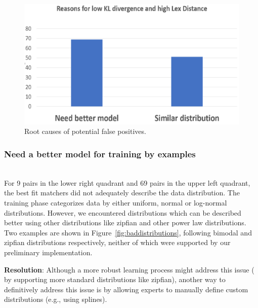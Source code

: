 \begin{figure}
	\centering
	\includegraphics[width=\columnwidth]{graphics/Upper_left_quad}
	\caption{Root causes of potential false positives.}
	\label{fig:datatags:upperleft}
	\trimfigurespacing
\end{figure}

\smallskip
\subsubsection{Need a better model for training by examples}~\\
For 9 pairs in the lower right quadrant and 69 pairs in the upper left quadrant, the best fit matchers did not adequately describe the data distribution.
The training phase categorizes data by either uniform, normal or log-normal distributions. 
However, we encountered distributions which can be described better using other distributions like zipfian and other power law distributions.
Two examples are shown in Figure~\ref{fig:baddistributions}, following bimodal and zipfian distributions respectively, neither of which were supported by our preliminary implementation.

\textbf{Resolution}: Although a more robust learning process might address this issue ( by supporting more standard distributions like zipfian), another way to definitively address this issue is by allowing experts to manually define custom distributions (e.g., using splines).

